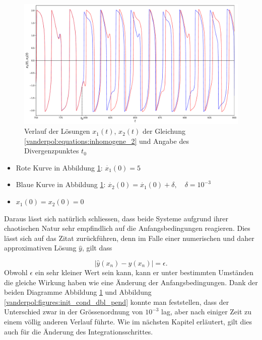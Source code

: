 \begin{figure}
\includegraphics[width=\textwidth]{papers/vanderpol/figures/initial_cond_VDP.pdf}
\caption{Verlauf der Lösungen $x_1(t)$, $x_2(t)$ der Gleichung \eqref{vanderpol:equations:inhomogene_2} und Angabe des Divergenzpunktes $t_0$ \label{vanderpol:figures:init_cond_VDP}}
\end{figure}

\begin{itemize}
\item
Rote Kurve in Abbildung \ref{vanderpol:figures:init_cond_VDP}: $\dot{x_1}(0) = 5$
\item
Blaue Kurve in Abbildung \ref{vanderpol:figures:init_cond_VDP}: $\dot{x_2}(0) = \dot{x_1}(0) + \delta, \quad \delta = 10^{-3}$ 
\item
$x_1(0) = x_2(0) = 0$
\end{itemize}
Daraus lässt sich natürlich schliessen, dass beide Systeme aufgrund ihrer chaotischen Natur sehr empfindlich auf die Anfangsbedingungen reagieren. Dies lässt sich auf das Zitat zurückführen, denn im Falle einer numerischen und daher approximativen Lösung $\hat{y}$, gilt dass

\begin{equation} 
|\hat{y}(x_n) - y(x_n)| = \epsilon.
\end{equation}
Obwohl $\epsilon$ ein sehr kleiner Wert sein kann, kann er unter bestimmten Umständen die gleiche Wirkung haben wie eine Änderung der Anfangsbedingungen. Dank der beiden Diagramme Abbildung \ref{vanderpol:figures:init_cond_VDP} und Abbildung \ref{vanderpol:figures:init_cond_dbl_pend} konnte man feststellen, dass der Unterschied zwar in der Grössenordnung von $10^{-3}$ lag, aber nach einiger Zeit zu einem völlig anderen Verlauf führte. Wie im nächsten Kapitel erläutert, gilt dies auch für die Änderung des Integrationsschrittes.


